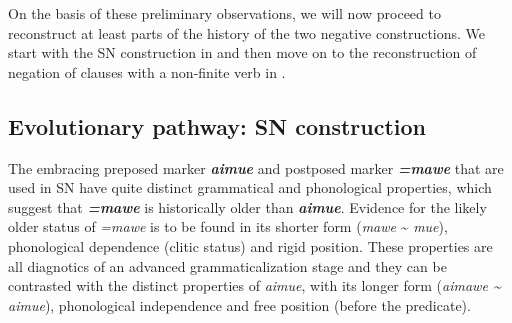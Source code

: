 \documentclass[output=paper]{langsci/langscibook}
\begin{document}
On the basis of these preliminary observations, we will now proceed to
reconstruct at least parts of the history of the two negative
constructions. We start with the SN construction in
 and then move on to the reconstruction of
negation of clauses with a non-finite verb in .

\subsection{Evolutionary pathway: SN construction}\label{sec:tacana-10.1}

The embracing preposed marker \textbf{\textit{aimue}} and postposed marker
\textbf{\textit{=mawe}} that are used in SN have quite distinct grammatical
and phonological properties, which suggest that \textbf{\textit{=mawe}} is historically older than \textbf{\textit{aimue}}. Evidence for the likely older status of \textit{=mawe} is to be found in its shorter form (\textit{mawe} {\textasciitilde} \textit{mue}), phonological dependence (clitic status) and rigid position. These properties are all diagnotics of an advanced grammaticalization stage and they can be contrasted with the distinct properties of \textit{aimue}, with its longer form (\textit{aimawe {\textasciitilde} aimue}), phonological independence and free position (before the predicate).
\end{document}
